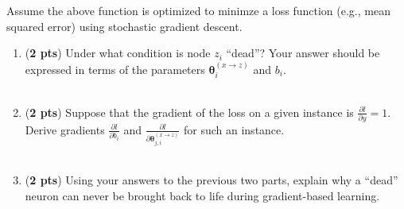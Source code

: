 \documentclass[11pt, letterpaper]{article}
\begin{document}
    Assume the above function is optimized to minimze a loss function (e.g., mean squared error) using stochastic gradient descent. 
    
    \begin{enumerate}
        \item (\textbf{2 pts}) Under what condition is node $z_i$ ``dead''? Your answer should be expressed in terms of the parameters $\mathbf{\theta}_i^{(x \rightarrow z)}$ and $b_i$.\\\\
        
        \item (\textbf{2 pts}) Suppose that the gradient of the loss on a given instance is $\frac{\partial l}{\partial y} = 1$. Derive gradients $\frac{\partial l}{\partial b_i}$ and $\frac{\partial l}{\partial \mathbf{\theta}_{j,i}^{(x \rightarrow z)}}$ for such an instance.\\\\
        
        \item (\textbf{2 pts}) Using your answers to the previous two parts, explain why a ``dead'' neuron can never be brought back to life during gradient-based learning. \\\\
    
    \end{enumerate}
\end{document}
